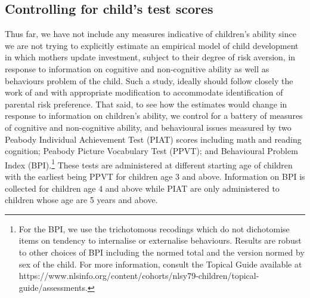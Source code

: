 \documentclass[emulatestandardclasses, 10pt, abstract = true]{scrartcl}
\begin{document}
\subsection{Controlling for child's test scores}

Thus far, we have not include any measures indicative of children's ability since we are not trying to explicitly estimate an empirical model of child development in which mothers update investment, subject to their degree of risk aversion, in response to information on cognitive and non-cognitive ability as well as behaviours problem of the child. Such a study, ideally should follow closely the work of \citet{cunha2007technology} and \citet{cunha2010estimating} with appropriate modification to accommodate identification of parental risk preference. That said, to see how the estimates would change in response to information on children's ability, we control for a battery of measures of cognitive and non-cognitive ability, and behavioural issues measured by two Peabody Individual Achievement Test (PIAT) scores including math and reading cognition; Peabody Picture Vocabulary Test (PPVT); and Behavioural Problem Index (BPI).\footnote{For the BPI, we use the trichotomous recodings which do not dichotomise items on tendency to internalise or externalise behaviours. Results are robust to other choices of BPI including the normed total and the version normed by sex of the child. For more information, consult the Topical Guide available at  https://www.nlsinfo.org/content/cohorts/nlsy79-children/topical-guide/assessments.} These tests are administered at different starting age of children with the earliest being PPVT for children age 3 and above. Information on BPI is collected for children age 4 and above while PIAT are only administered to children whose age are 5 years and above. 
\end{document}

